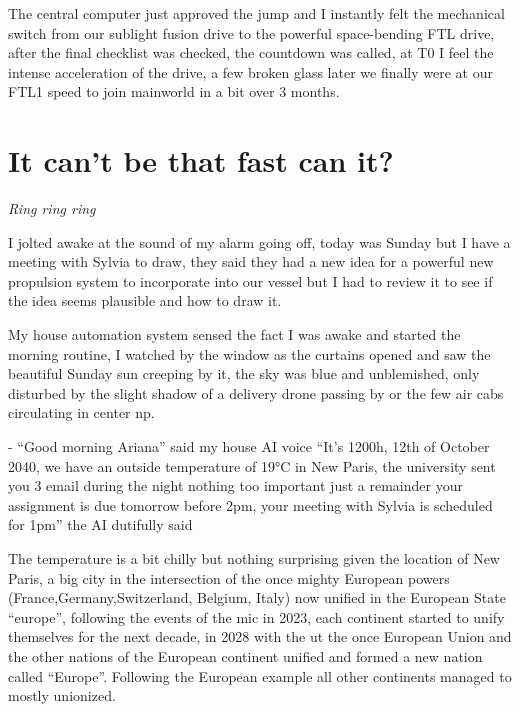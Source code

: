 \documentclass[hidelinks,12pt,a4paper]{book}
\begin{document}
The central computer just approved the jump and I instantly felt the mechanical switch 
from our sublight fusion drive to the powerful space-bending FTL drive, 
after the final checklist was checked, the countdown was called, at T0 I feel the intense acceleration of the drive, 
a few broken glass later we finally were at our FTL1 speed to join mainworld in a bit over 3 months.\par


\chapter{It can't be that fast can it?}

\textit{Ring ring ring}\par
I jolted awake at the sound of my alarm going off, 
today was Sunday but I have a meeting with Sylvia to draw, 
they said they had a new idea for a powerful new propulsion system to incorporate into our vessel but 
I had to review it to see if the idea seems plausible and how to draw it.\par
\bigskip
My house automation system sensed the fact I was awake and 
started the morning routine, I watched by the window as the curtains opened and 
saw the beautiful Sunday sun creeping by it, the sky was blue and unblemished, only disturbed by the 
slight shadow of a delivery drone passing by or the few air cabs circulating in center \gls{np}.\par
\bigskip
- “Good morning Ariana” said my house AI voice\newline
“It's 1200h, 12th of October 2040, we have an outside temperature of 19°C in New Paris, 
the university sent you 3 email during the night nothing too important just a remainder your 
assignment is due tomorrow before 2pm, your meeting with Sylvia is scheduled for 1pm” the AI dutifully said\par
\bigskip

The temperature is a bit chilly but nothing surprising given the location of New Paris,
a big city in the intersection of the once mighty European powers (France,Germany,Switzerland, Belgium, Italy) 
now unified in the European State “\gls{europe}”, following the events of the \gls{mic} in 2023, 
each continent started to unify themselves for the next decade, in 2028 with the \gls{ut} the once European Union 
and the other nations of the European continent unified and formed a new nation called “Europe”. 
Following the European example all other continents managed to mostly unionized.\par
\bigskip 
\end{document}
